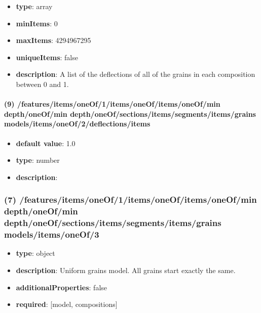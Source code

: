 \begin{itemize}[leftmargin=8em]\item {\bf type}: array
\item {\bf minItems}: 0
\item {\bf maxItems}: 4294967295
\item {\bf uniqueItems}: false
\item {\bf description}: A list of the deflections of all of the grains in each composition between 0 and 1.
\end{itemize}\paragraph{(9) /features/items/oneOf/1/items/oneOf/items/oneOf/min depth/oneOf/min depth/oneOf/sections/items/segments/items/grains models/items/oneOf/2/deflections/items}
\begin{itemize}[leftmargin=9em]\item {\bf default value}: 1.0
\item {\bf type}: number
\item {\bf description}: 
\end{itemize}\subsubsection{(7) /features/items/oneOf/1/items/oneOf/items/oneOf/min depth/oneOf/min depth/oneOf/sections/items/segments/items/grains models/items/oneOf/3}
\begin{itemize}[leftmargin=7em]\item {\bf type}: object
\item {\bf description}: Uniform grains model. All grains start exactly the same.
\item {\bf additionalProperties}: false
\item {\bf required}: [model, compositions]\end{itemize}
